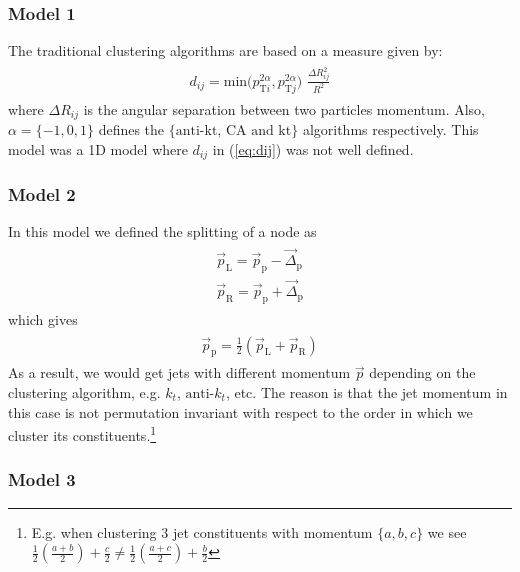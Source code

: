 \documentclass[12pt]{article}
\newcommand{\bea}{\begin{eqnarray}\begin{aligned}}
\newcommand{\eea}{\end{aligned}\end{eqnarray}}
\begin{document}
\subsubsection{Model 1}

The traditional clustering algorithms are based on a measure given by:
\bea\label{eq:dij}
d_{ij}= \text{min}({p_{\text{T}i}^{2\alpha}, {p_{\text{T}j}^{2\alpha}})\,\, \frac{\Delta R_{ij}^2}{R^2}}
\eea
where $\Delta R_{ij}$ is the angular separation between two particles momentum. Also, $\alpha=\{-1,0,1\}$ defines the $\{\text{anti-kt, CA and kt}\}$ algorithms respectively. 
This model was a 1D model where $d_{ij}$ in (\ref{eq:dij}) was not well defined.

\subsubsection{Model 2}

In this model we defined the splitting of a node as
\bea\label{eq:pLRb}
\vec{p}_\text{L}= \vec{p}_\text{p} - \vec{\Delta}_\text{p}  \\
\vec{p}_\text{R}= \vec{p}_\text{p} +\vec{\Delta}_\text{p}
\eea
which gives
\bea
\vec{p}_\text{p}= \frac{1}{2} (\vec{p}_\text{L} + \vec{p}_\text{R} ) 
\eea
As a result, we would get jets with different momentum $\vec{p}$ depending on the clustering algorithm, e.g. $k_t$, $\text{anti-}k_t$, etc. The reason is that the jet momentum in this case is not permutation invariant with respect to the order in which we cluster its constituents.\footnote{E.g. when clustering 3 jet constituents with momentum $\{a,b,c\}$ we see $\frac{1}{2}(\frac{a+b}{2})+\frac{c}{2} \neq \frac{1}{2}(\frac{a+c}{2})+\frac{b}{2}$}

\subsubsection{Model 3}
\end{document}
